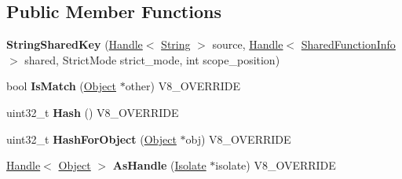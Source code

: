 \subsection*{Public Member Functions}
\begin{DoxyCompactItemize}
\item 
\hypertarget{classv8_1_1internal_1_1_string_shared_key_a86bad50c195afc50cad7a0386e96f6f2}{}{\bfseries String\+Shared\+Key} (\hyperlink{classv8_1_1internal_1_1_handle}{Handle}$<$ \hyperlink{classv8_1_1internal_1_1_string}{String} $>$ source, \hyperlink{classv8_1_1internal_1_1_handle}{Handle}$<$ \hyperlink{classv8_1_1internal_1_1_shared_function_info}{Shared\+Function\+Info} $>$ shared, Strict\+Mode strict\+\_\+mode, int scope\+\_\+position)\label{classv8_1_1internal_1_1_string_shared_key_a86bad50c195afc50cad7a0386e96f6f2}

\item 
\hypertarget{classv8_1_1internal_1_1_string_shared_key_afdd9ca2a5df2340fa50e6e032b77915f}{}bool {\bfseries Is\+Match} (\hyperlink{classv8_1_1internal_1_1_object}{Object} $\ast$other) V8\+\_\+\+O\+V\+E\+R\+R\+I\+D\+E\label{classv8_1_1internal_1_1_string_shared_key_afdd9ca2a5df2340fa50e6e032b77915f}

\item 
\hypertarget{classv8_1_1internal_1_1_string_shared_key_a4f95e9421bc822358e0ca9ab24e9bd8e}{}uint32\+\_\+t {\bfseries Hash} () V8\+\_\+\+O\+V\+E\+R\+R\+I\+D\+E\label{classv8_1_1internal_1_1_string_shared_key_a4f95e9421bc822358e0ca9ab24e9bd8e}

\item 
\hypertarget{classv8_1_1internal_1_1_string_shared_key_af96c85ee6acba8b89d039150b359482e}{}uint32\+\_\+t {\bfseries Hash\+For\+Object} (\hyperlink{classv8_1_1internal_1_1_object}{Object} $\ast$obj) V8\+\_\+\+O\+V\+E\+R\+R\+I\+D\+E\label{classv8_1_1internal_1_1_string_shared_key_af96c85ee6acba8b89d039150b359482e}

\item 
\hypertarget{classv8_1_1internal_1_1_string_shared_key_a249247b39114bdc98603c41c7783e7ab}{}\hyperlink{classv8_1_1internal_1_1_handle}{Handle}$<$ \hyperlink{classv8_1_1internal_1_1_object}{Object} $>$ {\bfseries As\+Handle} (\hyperlink{classv8_1_1internal_1_1_isolate}{Isolate} $\ast$isolate) V8\+\_\+\+O\+V\+E\+R\+R\+I\+D\+E\label{classv8_1_1internal_1_1_string_shared_key_a249247b39114bdc98603c41c7783e7ab}

\end{DoxyCompactItemize}
